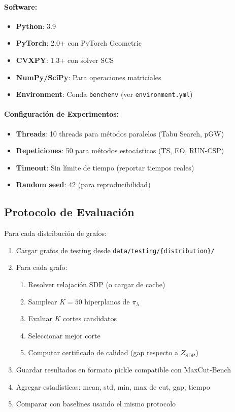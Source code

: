 \documentclass{article}
\begin{document}
\paragraph{Software:}
\begin{itemize}
    \item \textbf{Python}: 3.9
    \item \textbf{PyTorch}: 2.0+ con PyTorch Geometric
    \item \textbf{CVXPY}: 1.3+ con solver SCS
    \item \textbf{NumPy/SciPy}: Para operaciones matriciales
    \item \textbf{Environment}: Conda \texttt{benchenv} (ver \texttt{environment.yml})
\end{itemize}

\paragraph{Configuración de Experimentos:}
\begin{itemize}
    \item \textbf{Threads}: 10 threads para métodos paralelos (Tabu Search, pGW)
    \item \textbf{Repeticiones}: 50 para métodos estocásticos (TS, EO, RUN-CSP)
    \item \textbf{Timeout}: Sin límite de tiempo (reportar tiempos reales)
    \item \textbf{Random seed}: 42 (para reproducibilidad)
\end{itemize}

\subsection{Protocolo de Evaluación}

Para cada distribución de grafos:
\begin{enumerate}
    \item Cargar grafos de testing desde \texttt{data/testing/\{distribution\}/}
    \item Para cada grafo:
    \begin{enumerate}
        \item Resolver relajación SDP (o cargar de cache)
        \item Samplear $K=50$ hiperplanos de $\pi_\lambda$
        \item Evaluar $K$ cortes candidatos
        \item Seleccionar mejor corte
        \item Computar certificado de calidad (gap respecto a $Z_{\text{SDP}}$)
    \end{enumerate}
    \item Guardar resultados en formato pickle compatible con MaxCut-Bench
    \item Agregar estadísticas: mean, std, min, max de cut, gap, tiempo
    \item Comparar con baselines usando el mismo protocolo
\end{enumerate}
\end{document}
